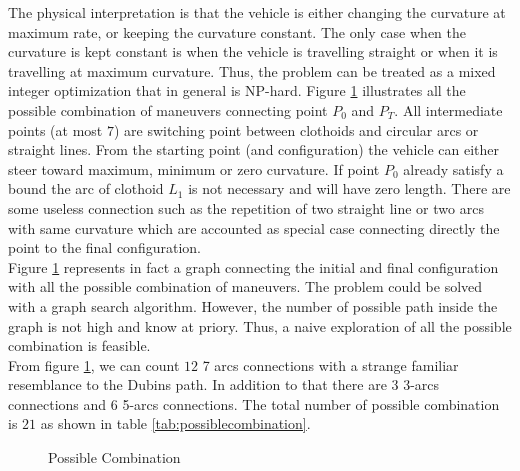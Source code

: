 \documentclass[11pt,twocolumn]{scrartcl}
\begin{document}
The physical interpretation is that the vehicle is either changing the curvature at maximum rate, or keeping the curvature constant.
The only case when the curvature is kept constant is when the vehicle is travelling straight or when it is travelling at maximum curvature.
Thus, the problem can be treated as a mixed integer optimization that in general is NP-hard.
%
Figure \ref{fig:possiblecombination} illustrates all the possible combination of maneuvers connecting point $P_0$ and $P_T$. All intermediate points (at most $7$) are switching point between clothoids and circular arcs or straight lines. From the starting point (and configuration) the vehicle can either steer toward maximum, minimum or zero curvature. If point $P_0$ already satisfy a bound the arc of clothoid $L_1$ is not necessary and will have zero length.
There are some useless connection such as the repetition of two straight line or two arcs with same curvature which are accounted as special case connecting directly the point to the final configuration.
\\
Figure \ref{fig:possiblecombination} represents in fact a graph connecting the initial and final configuration with all the possible combination of maneuvers. The problem could be solved with a graph search algorithm. However, the number of possible path inside the graph is not high and know at priory. Thus, a naive exploration of all the possible combination is feasible.
\\
From figure \ref{fig:possiblecombination}, we can count $12$ 7 arcs connections with a strange familiar resemblance to the Dubins path. In addition to that there are $3$ 3-arcs connections and $6$ 5-arcs connections. The total number of possible combination is $21$ as shown in table \ref{tab:possiblecombination}.
%
\begin{figure}[ht]
  \centering
  \resizebox{\linewidth}{!}{%
  }%
  \caption{Possible Combination}
  \label{fig:possiblecombination}
\end{figure}
%
\end{document}
